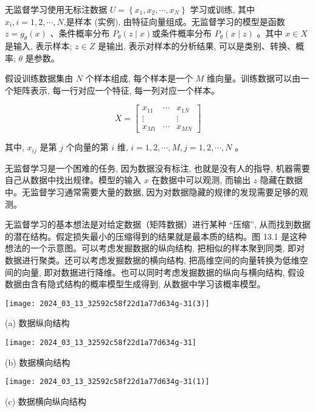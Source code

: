 \documentclass[10pt]{article}
\begin{document}
\begin{CJK*}{UTF8}{bsmi}
无监督学习使用无标注数据 $U=\left\{x_{1}, x_{2}, \cdots, x_{N}\right\}$ 学习或训练, 其中 $x_{i}, i=1,2, \cdots, N$,是样本 (实例), 由特征向量组成。无监督学习的模型是函数 $z=g_{\theta}(x)$ 、条件概率分布 $P_{\theta}(z \mid x)$或条件概率分布 $P_{\theta}(x \mid z)$ 。其中 $x \in X$ 是输入, 表示样本; $z \in Z$ 是输出, 表示对样本的分析结果, 可以是类别、转换、概率; $\theta$ 是参数。

假设训练数据集由 $N$ 个样本组成, 每个样本是一个 $M$ 维向量。训练数据可以由一个矩阵表示, 每一行对应一个特征, 每一列对应一个样本。

$$
X=\left[\begin{array}{ccc}
x_{11} & \cdots & x_{1 N} \\
\vdots & & \vdots \\
x_{M 1} & \cdots & x_{M N}
\end{array}\right]
$$

其中, $x_{i j}$ 是第 $j$ 个向量的第 $i$ 维, $i=1,2, \cdots, M, j=1,2, \cdots, N$ 。

无监督学习是一个困难的任务, 因为数据没有标注, 也就是没有人的指导, 机器需要自己从数据中找出规律。模型的输入 $x$ 在数据中可以观测, 而输出 $z$ 隐藏在数据中。无监督学习通常需要大量的数据, 因为对数据隐藏的规律的发现需要足够的观测。

无监督学习的基本想法是对给定数据（矩阵数据）进行某种 “压缩”, 从而找到数据的潜在结构。假定损失最小的压缩得到的结果就是最本质的结构。图 13.1 是这种想法的一个示意图。可以考虑发掘数据的纵向结构, 把相似的样本聚到同类, 即对数据进行聚类。还可以考虑发掘数据的横向结构, 把高维空间的向量转换为低维空间的向量, 即对数据进行降维。也可以同时考虑发掘数据的纵向与横向结构, 假设数据由含有隐式结构的概率模型生成得到, 从数据中学习该概率模型。

\begin{center}
\texttt{[image: 2024\_03\_13\_32592c58f22d1a77d634g-31(3)]}
\end{center}

(a) 数据纵向结构

\begin{center}
\texttt{[image: 2024\_03\_13\_32592c58f22d1a77d634g-31]}
\end{center}

(b) 数据横向结构

\begin{center}
\texttt{[image: 2024\_03\_13\_32592c58f22d1a77d634g-31(1)]}
\end{center}

(c) 数据横向纵向结构


\end{CJK*}
\end{document}
